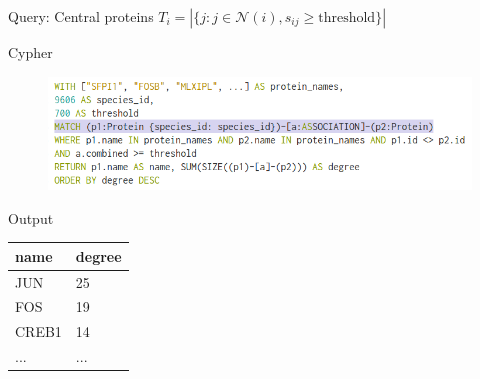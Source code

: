 \documentclass{beamer}
\begin{document}
\begin{frame}{Query: Central proteins}
$  T_i = |\{j : j \in \mathcal{N}(i), s_{ij} \geqslant \text{threshold}\}| $
\begin{block}{Cypher}
\begin{figure}
    \centering
    \includegraphics[width=\linewidth]{central_proteins_query.png}
\end{figure}
\end{block}
\vfill
\begin{block}{Output}
\scriptsize
    \begin{tabular}{| l | l |}
        \hline
        name & degree \\ \hline \hline
        JUN & 25 \\ \hline
        FOS & 19 \\ \hline
        CREB1 & 14 \\ \hline
        ... & ... \\
        \hline
    \end{tabular}
\end{block}
\end{frame}
\end{document}
